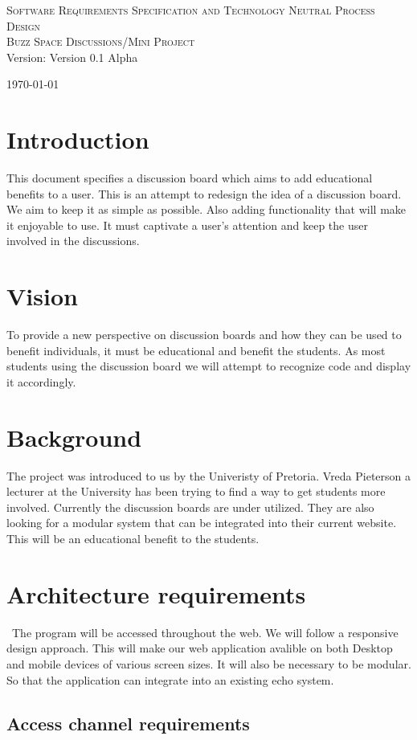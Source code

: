 \documentclass[a4paper,12pt]{report}
\begin{document}
\renewcommand{\thesection}{\arabic{section}}
\newpage
\begin{center}
\textsc{\LARGE Software Requirements Specification and Technology Neutral Process Design}\\[1.5cm]
\textsc{\Large Buzz Space Discussions/Mini Project}\\[0.5cm]
Version: Version 0.1 Alpha 

\today
\end{center}
\tableofcontents{}
\section{Introduction}
This document specifies a discussion board which aims to add educational benefits to a user. This is an attempt to redesign the idea of a discussion board. We aim to keep it as simple as possible. Also adding functionality that will make it enjoyable to use. It must captivate a user's attention and keep the user involved in the discussions. 
\section{Vision}
To provide a new perspective on discussion boards and how they can be used to benefit individuals, it must be educational and benefit the students. As most students using the discussion board we will attempt to recognize code and display it accordingly.
\section{Background}
The project was introduced to us by the Univeristy of Pretoria. Vreda Pieterson a lecturer at the University has been trying to find a way to get students more involved. Currently the discussion boards are under utilized. They are also looking for a modular system that can be integrated into their current website. This will be an educational benefit to the students.
\section{Architecture requirements}\
The program will be accessed throughout the web. We will follow a responsive design approach. This will make our web application avalible on both Desktop and mobile devices of various screen sizes. It will also be necessary to be modular. So that the application can integrate into an existing echo system.
\subsection{Access channel requirements}
\end{document}
